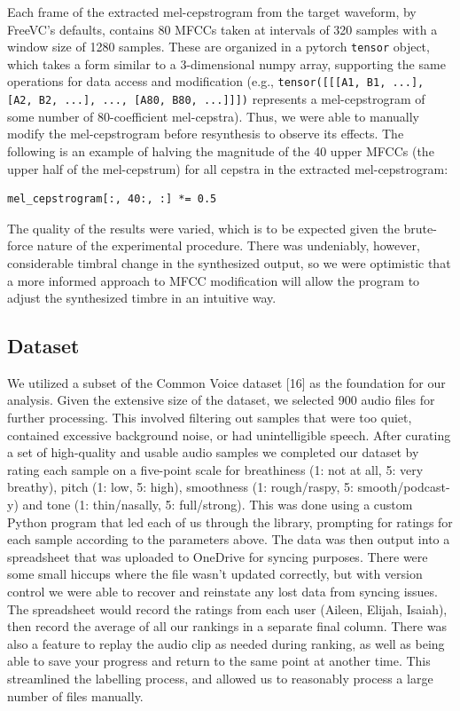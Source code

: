 \documentclass{article}
\begin{document}
Each frame of the extracted mel-cepstrogram from the target waveform, by FreeVC's defaults, contains 80 MFCCs taken at intervals of 320 samples with a window size of 1280 samples. These are organized in a pytorch \texttt{tensor} object, which takes a form similar to a 3-dimensional numpy array, supporting the same operations for data access and modification (e.g., \texttt{tensor([[[A1, B1, ...], [A2, B2, ...], ..., [A80, B80, ...]]])} represents a mel-cepstrogram of some number of 80-coefficient mel-cepstra). Thus, we were able to manually modify the mel-cepstrogram before resynthesis to observe its effects. The following is an example of halving the magnitude of the 40 upper MFCCs (the upper half of the mel-cepstrum) for all cepstra in the extracted mel-cepstrogram:

\begin{verbatim}
mel_cepstrogram[:, 40:, :] *= 0.5
\end{verbatim}

The quality of the results were varied, which is to be expected given the brute-force nature of the experimental procedure. There was undeniably, however, considerable timbral change in the synthesized output, so we were optimistic that a more informed approach to MFCC modification will allow the program to adjust the synthesized timbre in an intuitive way.


\subsection{Dataset}

We utilized a subset of the Common Voice dataset [16] as the foundation for our analysis. Given the extensive size of the dataset, we selected 900 audio files for further processing. This involved filtering out samples that were too quiet, contained excessive background noise, or had unintelligible speech. After curating a set of high-quality and usable audio samples we completed our dataset by rating each sample on a five-point scale for breathiness (1: not at all, 5: very breathy), pitch (1: low, 5: high), smoothness (1: rough/raspy, 5: smooth/podcast-y) and tone (1: thin/nasally, 5: full/strong). This was done using a custom Python program that led each of us through the library, prompting for ratings for each sample according to the parameters above. The data was then output into a spreadsheet that was uploaded to OneDrive for syncing purposes. There were some small hiccups where the file wasn't updated correctly, but with version control we were able to recover and reinstate any lost data from syncing issues. The spreadsheet would record the ratings from each user (Aileen, Elijah, Isaiah), then record the average of all our rankings in a separate final column. There was also a feature to replay the audio clip as needed during ranking, as well as being able to save your progress and return to the same point at another time. This streamlined the labelling process, and allowed us to reasonably process a large number of files manually.
\end{document}

